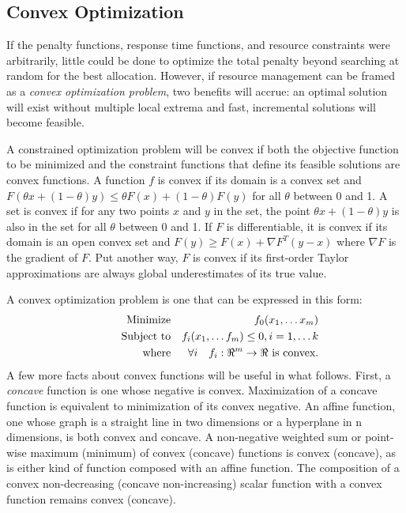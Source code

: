 \subsection*{Convex Optimization}
If the penalty functions, response time functions, and resource constraints were arbitrarily,
little could be done to optimize the total penalty beyond searching at random for the best allocation.
However, if resource management can be framed as a \emph{convex optimization problem}\cite{BoVa},
two benefits will accrue: an optimal solution will exist without multiple local extrema and
fast, incremental solutions will become feasible.

A constrained optimization problem will be convex if both the objective function to be minimized
and the constraint functions that define its feasible solutions are convex functions.
A function $f$ is convex if its domain is a convex set and
$F(\theta x + (1-\theta)y) \leq \theta F(x) + (1-\theta)F(y)$
for all $\theta$ between 0 and 1.
A set is convex if for any two points $x$ and $y$ in the set, the point
$\theta x + (1-\theta)y$
is also in the set for all $\theta$ between 0 and 1.
If $F$ is differentiable, it is convex if its domain is an open convex set and
$F(y) \geq F(x) + \nabla F^T(y-x)$ where $\nabla F$ is the gradient of $F$.
Put another way, $F$ is convex if its first-order Taylor approximations
are always global underestimates of its true value.

A convex optimization problem is one that can be expressed in this form:
\begin{eqnarray*}
& \makebox[1in][r]{Minimize}   & f_0(x_1,\ldots x_m)                              \\
& \makebox[1in][r]{Subject to} & f_i(x_1,\ldots f_m) \leq 0, i = 1,\ldots k        \\
& \makebox[1in][r]{where}      & \forall i \quad f_i:\Re^m \rightarrow \Re \mbox{ is convex.}
\end{eqnarray*}
A few more facts about convex functions will be useful in what follows.
First, a \emph{concave} function is one whose negative is convex.
Maximization of a concave function is equivalent to minimization of its convex negative.
An affine function, one whose graph is a straight line in two dimensions or a hyperplane in n dimensions,
is both convex and concave.  A non-negative weighted sum or point-wise maximum (minimum) of convex (concave) functions is convex (concave), as is either kind of function composed with an affine function.  The composition of a convex non-decreasing (concave non-increasing) scalar function with a convex function remains convex (concave).

